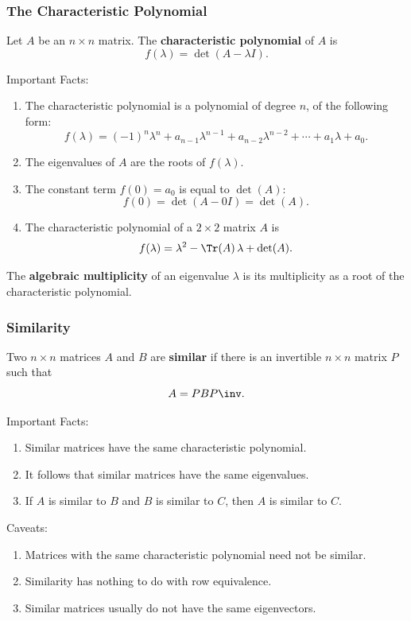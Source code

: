 \begin{frame}
\frametitle{The Characteristic Polynomial}

\vskip-3mm
\begin{defn}
  Let $A$ be an $n\times n$ matrix.  The \textbf{characteristic polynomial} of
  $A$ is 
  \[ f(\lambda) = \det(A-\lambda I). \]
\end{defn}

\pause
\alert{Important Facts:}
\pause
\begin{enumerate}
\item The characteristic polynomial is a polynomial of degree $n$, of the
  following form:
  \[ f(\lambda)
  = (-1)^n\lambda^n + a_{n-1}\lambda^{n-1} + a_{n-2}\lambda^{n-2} 
  + \cdots + a_1\lambda + a_0. \]
  \vskip-3mm
  \pause
\item The eigenvalues of $A$ are the roots of $f(\lambda)$.
  \pause
\item The constant term $f(0) = a_0$ is equal to $\det(A)$:
  \[ f(0) = \det(A-0I) = \det(A). \]
  \vskip-5mm\pause
\item The characteristic polynomial of a $2\times 2$ matrix $A$ is
  \[ f(\lambda) = \lambda^2 - \Tr(A)\,\lambda + \det(A). \]
\end{enumerate}

\pause
\begin{defn}
  The \textbf{algebraic multiplicity} of an eigenvalue $\lambda$ is its
  multiplicity as a root of the characteristic polynomial.
\end{defn}

\end{frame}



\begin{frame}
\frametitle{Similarity}

\vskip-3mm
\begin{defn}
  Two $n\times n$ matrices $A$ and $B$ are \textbf{similar} if there is an
  invertible $n\times n$ matrix $P$ such that
  \[ A = PBP\inv. \]
\end{defn}

\pause
\alert{Important Facts:}
\pause
\begin{enumerate}
\item Similar matrices have the same characteristic polynomial.
\pause
\item It follows that similar matrices have the same eigenvalues.
\pause
\item If $A$ is similar to $B$ and $B$ is similar to $C$, then $A$ is similar to
  $C$. 
\end{enumerate}

\pause\medskip
\alert{Caveats:}
\pause
\begin{enumerate}
\item Matrices with the same characteristic polynomial need not be similar.
\pause
\item Similarity has nothing to do with row equivalence.
\pause
\item Similar matrices usually do not have the same eigenvectors.
\end{enumerate}

\end{frame}


